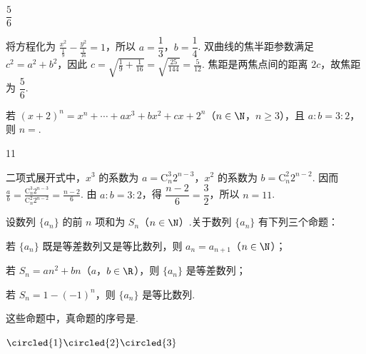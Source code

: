 \begin{answer}
\(\dfrac{5}{6}\)
\end{answer}

\begin{solution}
将方程化为 \(\displaystyle\frac{x^{2}}{\frac{1}{9}}-\frac{y^{2}}{\frac{1}{16}}=1\)，所以
\(a=\dfrac13\)，\(b=\dfrac14\). 双曲线的焦半距参数满足
\(c^{2}=a^{2}+b^{2}\)，因此
\(\displaystyle c=\sqrt{\frac19+\frac1{16}}=\sqrt{\frac{25}{144}}=\frac5{12}\).
焦距是两焦点间的距离 \(2c\)，故焦距为 \(\dfrac56\).
\end{solution}

\begin{problem}
若 \((x+2)^{n}=x^{n}+\cdots+ax^{3}+bx^{2}+cx+2^{n}\)（\(n\in\N\)，\(n\geqslant3\)），且 \(a:b=3:2\)，则 \(n=\)\fillinblank{}.
\end{problem}

\begin{answer}
11
\end{answer}

\begin{solution}
二项式展开式中，\(x^{3}\) 的系数为 \(a=\mathrm C_{n}^{3}2^{n-3}\)，\(x^{2}\) 的系数为 \(b=\mathrm C_{n}^{2}2^{n-2}\). 因而 \(\displaystyle\frac{a}{b}=\frac{\mathrm C_{n}^{3}2^{n-3}}{\mathrm C_{n}^{2}2^{n-2}}=\frac{n-2}{6}\). 由 \(a:b=3:2\)，得 \(\dfrac{n-2}{6}=\dfrac{3}{2}\)，所以 \(n=11\).
\end{solution}

\begin{problem}
设数列 \(\{a_n\}\) 的前 \(n\) 项和为 \(S_{n}\)（\(n \in \N\)）.关于数列 \(\{a_n\}\) 有下列三个命题：

\begin{circlelist}
\item 若 \(\{a_{n}\}\) 既是等差数列又是等比数列，则 \(a_{n} = a_{n + 1}\)（\(n \in \N\)）；
\item 若 \(S_{n} = an^{2} + bn\)（\(a\)，\(b \in \R\)），则 \(\{a_{n}\}\) 是等差数列；
\item 若 \(S_{n} = 1 - (-1)^{n}\)，则 \(\{a_{n}\}\) 是等比数列.
\end{circlelist}

这些命题中，真命题的序号是\fillinblank{}.
\end{problem}

\begin{answer}
\(\circled{1}\circled{2}\circled{3}\)
\end{answer}

